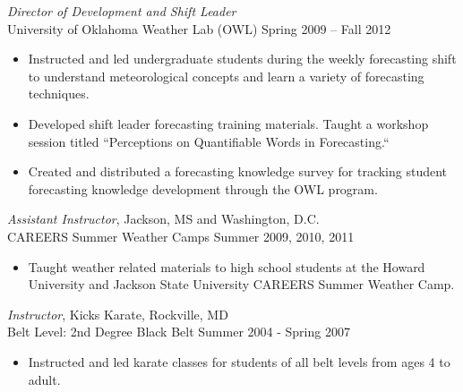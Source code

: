 \documentclass[10pt]{res} %
\begin{document}
\begin{resume}
{\sl Director of Development and Shift Leader} \\[2pt]
University of Oklahoma Weather Lab (OWL) \hfill Spring 2009 -- Fall 2012 
\begin{itemize} \itemsep 2pt %
\item Instructed and led undergraduate students during the weekly forecasting shift to understand meteorological concepts and learn a variety of forecasting techniques.
\item Developed shift leader forecasting training materials.  Taught a workshop session titled ``Perceptions on Quantifiable Words in Forecasting.``
\item Created and distributed a forecasting knowledge survey for tracking student forecasting knowledge development through the OWL program.
\end{itemize} 

{\sl Assistant Instructor}, Jackson, MS and Washington, D.C. \\[2pt]
CAREERS Summer Weather Camps \hfill Summer 2009, 2010, 2011 
\begin{itemize} \itemsep 2pt %
\item Taught weather related materials to high school students at the Howard University and Jackson State University CAREERS Summer Weather Camp.
\end{itemize} 

{\sl Instructor}, Kicks Karate, Rockville, MD \\[2pt]
Belt Level: 2nd Degree Black Belt \hfill Summer 2004 - Spring 2007 
\begin{itemize} \itemsep 2pt %
\item Instructed and led karate classes for students of all belt levels from ages 4 to adult.
\end{itemize} 


 


\end{resume}
\end{document}
